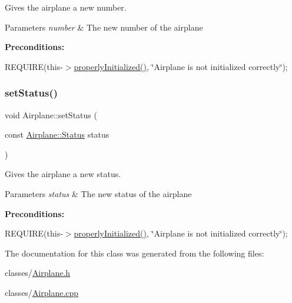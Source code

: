 Gives the airplane a new number. 


\begin{DoxyParams}{Parameters}
{\em number} & The new number of the airplane\\
\hline
\end{DoxyParams}
{\bfseries Preconditions\+:}
\begin{DoxyItemize}
\item R\+E\+Q\+U\+I\+RE(this-\/$>$\mbox{\hyperlink{class_airplane_a6f80df8f692cc8d67d292c1e9f26d59e}{properly\+Initialized()}}, \char`\"{}\+Airplane is not initialized correctly\char`\"{}); 
\end{DoxyItemize}\mbox{\label{class_airplane_adb44e51d140c297b5a05650f17d87125}} 
\subsubsection{\texorpdfstring{set\+Status()}{setStatus()}}
{\footnotesize\ttfamily void Airplane\+::set\+Status (\begin{DoxyParamCaption}\item[{const \mbox{\hyperlink{class_airplane_a2fe18f372ef9acb9d557998a560ad66e}{Airplane\+::\+Status}}}]{status }\end{DoxyParamCaption})}



Gives the airplane a new status. 


\begin{DoxyParams}{Parameters}
{\em status} & The new status of the airplane\\
\hline
\end{DoxyParams}
{\bfseries Preconditions\+:}
\begin{DoxyItemize}
\item R\+E\+Q\+U\+I\+RE(this-\/$>$\mbox{\hyperlink{class_airplane_a6f80df8f692cc8d67d292c1e9f26d59e}{properly\+Initialized()}}, \char`\"{}\+Airplane is not initialized correctly\char`\"{}); 
\end{DoxyItemize}

The documentation for this class was generated from the following files\+:\begin{DoxyCompactItemize}
\item 
classes/\mbox{\hyperlink{_airplane_8h}{Airplane.\+h}}\item 
classes/\mbox{\hyperlink{_airplane_8cpp}{Airplane.\+cpp}}\end{DoxyCompactItemize}
